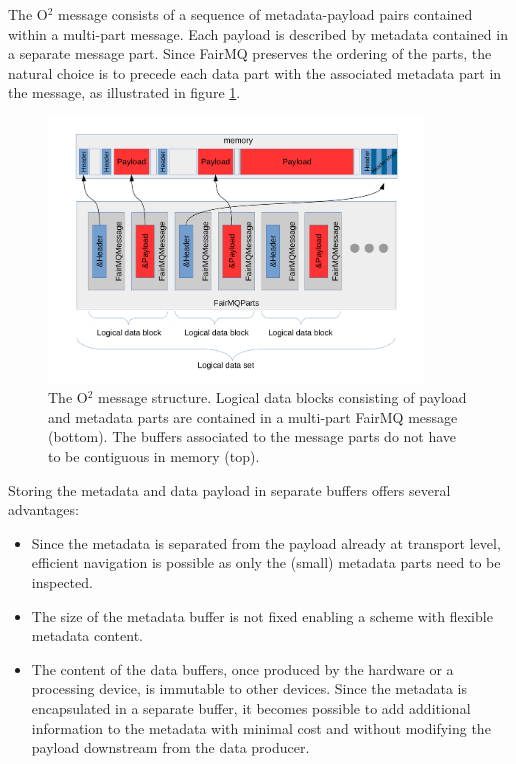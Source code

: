 \documentclass[a4paper,twoside]{article}
\def\O2{O$^2$}
\begin{document}
The \O2 message consists of a sequence of metadata-payload pairs contained within a multi-part message. Each payload is described by metadata contained in a separate message part. Since FairMQ preserves the ordering of the parts, the natural choice is to precede each data part with the associated metadata part in the message, as illustrated in figure \ref{fig:o2message}. 

\begin{figure}[h]
  \centering
  \includegraphics[width=0.89\textwidth]{multipartO2message.pdf}
  \caption{The \O2 message structure. Logical data blocks consisting of payload and metadata parts are contained in a multi-part FairMQ message (bottom). The buffers associated to the message parts do not have to be contiguous in memory (top).}
  \label{fig:o2message} 
\end{figure}

Storing the metadata and data payload in separate buffers offers several advantages:

\begin{itemize}
  \item Since the metadata is separated from the payload already at transport level, efficient navigation is possible as only the (small) metadata parts need to be inspected.
  \item The size of the metadata buffer is not fixed enabling a scheme with flexible metadata content.
  \item The content of the data buffers, once produced by the hardware or a processing device, is immutable to other devices. Since the metadata is encapsulated in a separate buffer, it becomes possible to add additional information to the metadata with minimal cost and without modifying the payload downstream from the data producer.
\end{itemize}
\end{document}
